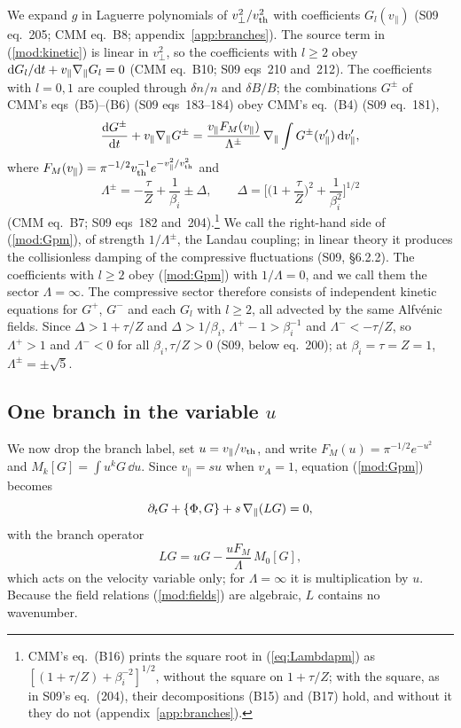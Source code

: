 We expand $g$ in Laguerre polynomials of $v_\perp^2/v_{\mathrm{th}}^2$ with coefficients $G_l(v_\parallel)$ (S09 eq.~205; CMM eq.~B8; appendix~\ref{app:branches}). The source term in (\ref{mod:kinetic}) is linear in $v_\perp^2$, so the coefficients with $l\ge2$ obey $\mathrm{d} G_l/\mathrm{d} t+v_\parallel\nabla_\parallel G_l=0$ (CMM eq.~B10; S09 eqs~210 and~212). The coefficients with $l=0,1$ are coupled through $\delta n/n$ and $\delta B/B$; the combinations $G^\pm$ of CMM's eqs~(B5)--(B6) (S09 eqs~183--184) obey CMM's eq.~(B4) (S09 eq.~181),
\begin{equation}\label{mod:Gpm}
  \frac{\mathrm{d} G^\pm}{\mathrm{d} t}+v_\parallel\nabla_\parallel G^\pm
  =\frac{v_\parallel F_M(v_\parallel)}{\Lambda^\pm}\,\nabla_\parallel\int G^\pm(v_\parallel')\,\mathrm{d} v_\parallel',
\end{equation}
where $F_M(v_\parallel)=\pi^{-1/2}v_{\mathrm{th}}^{-1}e^{-v_\parallel^2/v_{\mathrm{th}}^2}$ and
\begin{equation}\label{eq:Lambdapm}
  \Lambda^\pm=-\frac{\tau}{Z}+\frac{1}{\beta_i}\pm\Delta,\qquad
  \Delta=\Big[\Big(1+\frac{\tau}{Z}\Big)^2+\frac{1}{\beta_i^2}\Big]^{1/2}
\end{equation}
(CMM eq.~B7; S09 eqs~182 and~204).\footnote{CMM's eq.~(B16) prints the square root in (\ref{eq:Lambdapm}) as $[(1+\tau/Z)+\beta_i^{-2}]^{1/2}$, without the square on $1+\tau/Z$; with the square, as in S09's eq.~(204), their decompositions (B15) and (B17) hold, and without it they do not (appendix~\ref{app:branches}).} We call the right-hand side of (\ref{mod:Gpm}), of strength $1/\Lambda^\pm$, the Landau coupling; in linear theory it produces the collisionless damping of the compressive fluctuations (S09, \S6.2.2). The coefficients with $l\ge2$ obey (\ref{mod:Gpm}) with $1/\Lambda=0$, and we call them the sector $\Lambda=\infty$. The compressive sector therefore consists of independent kinetic equations for $G^+$, $G^-$ and each $G_l$ with $l\ge2$, all advected by the same Alfv\'enic fields. Since $\Delta>1+\tau/Z$ and $\Delta>1/\beta_i$, $\Lambda^+-1>\beta_i^{-1}$ and $\Lambda^-<-\tau/Z$, so $\Lambda^+>1$ and $\Lambda^-<0$ for all $\beta_i,\tau/Z>0$ (S09, below eq.~200); at $\beta_i=\tau=Z=1$, $\Lambda^\pm=\pm\sqrt5$.

\subsection{One branch in the variable \texorpdfstring{$u$}{u}}\label{mod:onebranch}

We now drop the branch label, set $u=v_\parallel/v_{\mathrm{th}}$, and write $F_M(u)=\pi^{-1/2}e^{-u^2}$ and $M_k[G]=\int u^kG\,\dd u$. Since $v_\parallel=su$ when $v_A=1$, equation (\ref{mod:Gpm}) becomes
\begin{equation}\label{eq:branch}
  \partial_tG+\{\Phi,G\}+s\,\nabla_\parallel(LG)=0,
\end{equation}
with the branch operator
\begin{equation}\label{eq:L}
  LG=uG-\frac{uF_M}{\Lambda}\,M_0[G],
\end{equation}
which acts on the velocity variable only; for $\Lambda=\infty$ it is multiplication by $u$. Because the field relations (\ref{mod:fields}) are algebraic, $L$ contains no wavenumber.

